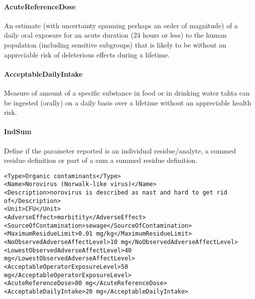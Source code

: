 \documentclass[a4paper]{report}
\begin{document}
\paragraph{AcuteReferenceDose}
An estimate (with uncertainty spanning perhaps an order of magnitude) of a daily oral exposure for an acute duration (24 hours or less) to the human population (including sensitive subgroups) that is likely to be without an appreciable risk of deleterious effects during a lifetime.

\paragraph{AcceptableDailyIntake}
Measure of amount of a specific substance in food or in drinking water tahta can be ingested (orally) on a daily basis over a lifetime without an appreciable health risk.

\paragraph{IndSum}
Define if the parameter reported is an individual residue/analyte, a summed residue definition or part of a sum a summed residue definition.

\begin{lstlisting}[basicstyle=\footnotesize, caption={Example of Hazard}]
<Type>Organic contaminants</Type>
<Name>Norovirus (Norwalk-like virus)</Name>
<Description>norovirus is described as nast and hard to get rid
of</Description>
<Unit>CFU</Unit>
<AdverseEffect>morbitity</AdverseEffect>
<SourceOfContamination>sewage</SourceOfContamination>
<MaximumResidueLimit>0.01 mg/kg</MaximumResidueLimit>
<NoObservedAdverseAffectLevel>10 mg</NoObservedAdverseAffectLevel>
<LowestObservedAdverseAffectLevel>40 mg</LowestObservedAdverseAffectLevel>
<AcceptableOperatorExposureLevel>50 mg</AcceptableOperatorExposureLevel>
<AcuteReferenceDose>80 mg</AcuteReferenceDose>
<AcceptableDailyIntake>20 mg</AcceptableDailyIntake>
\end{lstlisting}


\end{document}
